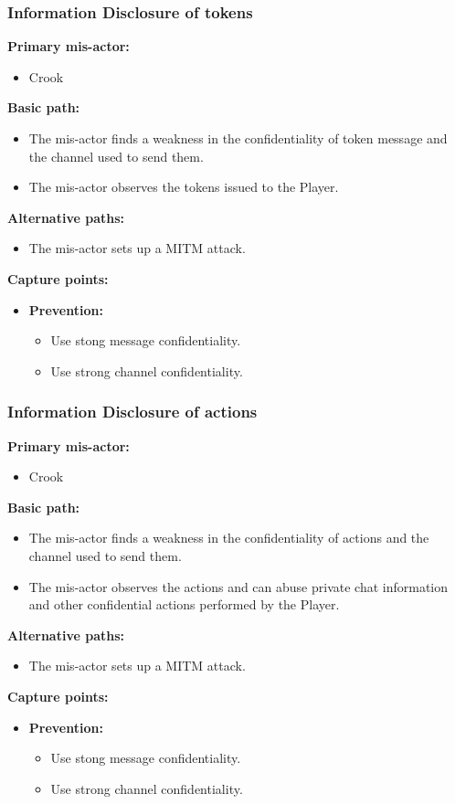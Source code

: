 \documentclass[a4paper,11pt]{report}
\begin{document}
\subsubsection{Information Disclosure of tokens}
\label{PlayerFlowCasesI2}
\textbf{Primary mis-actor:}
\begin{itemize}
\item Crook
\end{itemize}
\textbf{Basic path:}
\begin{itemize}
\item The mis-actor finds a weakness in the confidentiality of token message and the channel used to send them.
\item The mis-actor observes the tokens issued to the Player.
\end{itemize}
\textbf{Alternative paths:}
\begin{itemize}
\item The mis-actor sets up a MITM attack.
\end{itemize}
\textbf{Capture points:}
\begin{itemize}
\item \textbf{Prevention:}
\begin{itemize}
\item Use stong message confidentiality.
\item Use strong channel confidentiality.
\end{itemize}
\end{itemize}

\subsubsection{Information Disclosure of actions}
\label{PlayerFlowCasesI3}
\textbf{Primary mis-actor:}
\begin{itemize}
\item Crook
\end{itemize}
\textbf{Basic path:}
\begin{itemize}
\item The mis-actor finds a weakness in the confidentiality of actions and the channel used to send them.
\item The mis-actor observes the actions and can abuse private chat information and other confidential actions performed by the Player.
\end{itemize}
\textbf{Alternative paths:}
\begin{itemize}
\item The mis-actor sets up a MITM attack.
\end{itemize}
\textbf{Capture points:}
\begin{itemize}
\item \textbf{Prevention:}
\begin{itemize}
\item Use stong message confidentiality.
\item Use strong channel confidentiality.
\end{itemize}
\end{itemize}
\end{document}
